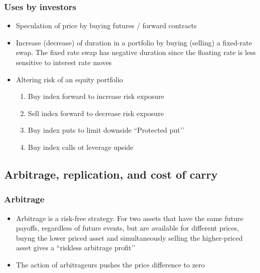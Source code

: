 \documentclass[../notes_compiled.tex]{subfiles}
\begin{document}
\subsubsection*{Uses by investors}
\begin{itemize}
\item Speculation of price by buying futures / forward contracts
\item Increase (decrease) of duration in a portfolio by buying (selling) a fixed-rate swap. The fixed rate swap has negative duration since the floating rate is less sensitive to interest rate moves
\item Altering risk of an equity portfolio
\begin{enumerate}
\item Buy index forward to increase risk exposure
\item Sell index forward to decrease risk exposure
\item Buy index puts to limit downside ``Protected put’’
\item Buy index calls ot leverage upside
\end{enumerate}
\end{itemize}

\subsection{Arbitrage, replication, and cost of carry}
\label{cash-and-carry}
\subsubsection*{Arbitrage}
\begin{itemize}
\item Arbitrage is a risk-free strategy. For two assets that have the same future payoffs, regardless of future events, but are available for different prices, buyng the lower priced asset and simultaneously selling the higher-priced asset gives a ``riskless arbitrage profit’’
\item The action of arbitrageurs pushes the price difference to zero
\end{itemize}
\end{document}
